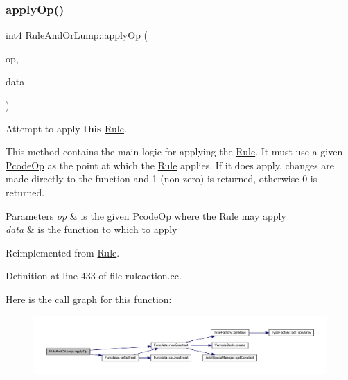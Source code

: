 \subsubsection{\texorpdfstring{applyOp()}{applyOp()}}
{\footnotesize\ttfamily int4 Rule\+And\+Or\+Lump\+::apply\+Op (\begin{DoxyParamCaption}\item[{\mbox{\hyperlink{class_pcode_op}{Pcode\+Op}} $\ast$}]{op,  }\item[{\mbox{\hyperlink{class_funcdata}{Funcdata}} \&}]{data }\end{DoxyParamCaption})\hspace{0.3cm}{\ttfamily [virtual]}}



Attempt to apply {\bfseries{this}} \mbox{\hyperlink{class_rule}{Rule}}. 

This method contains the main logic for applying the \mbox{\hyperlink{class_rule}{Rule}}. It must use a given \mbox{\hyperlink{class_pcode_op}{Pcode\+Op}} as the point at which the \mbox{\hyperlink{class_rule}{Rule}} applies. If it does apply, changes are made directly to the function and 1 (non-\/zero) is returned, otherwise 0 is returned. 
\begin{DoxyParams}{Parameters}
{\em op} & is the given \mbox{\hyperlink{class_pcode_op}{Pcode\+Op}} where the \mbox{\hyperlink{class_rule}{Rule}} may apply \\
\hline
{\em data} & is the function to which to apply \\
\hline
\end{DoxyParams}


Reimplemented from \mbox{\hyperlink{class_rule_a4e3e61f066670175009f60fb9dc60848}{Rule}}.



Definition at line 433 of file ruleaction.\+cc.

Here is the call graph for this function\+:
\nopagebreak
\begin{figure}[H]
\begin{center}
\leavevmode
\includegraphics[width=350pt]{class_rule_and_or_lump_aff7dd54db4bd5474329200371c8a3146_cgraph}
\end{center}
\end{figure}
\mbox{\label{class_rule_and_or_lump_a6ca08216a9a64058fae83a1718a67301}} 
